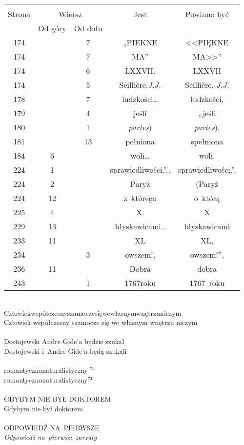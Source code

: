 \documentclass[a4paper,11pt]{article}
\begin{document}
\begin{center}
  \begin{tabular}{|c|c|c|c|c|}
    \hline
    & \multicolumn{2}{c|}{} & & \\
    Strona & \multicolumn{2}{c|}{Wiersz} & Jest
                              & Powinno być \\ \cline{2-3}
    & Od góry & Od dołu & & \\
    \hline
    174 & &  7 & „PIEKNE & <<PIĘKNE  %
    \\
    174 & &  7 & {\footnotesize MA}” & {\footnotesize MA}>>” \\
    174 & &  6 & LXXVII. & LXXVII \\
    174 & &  5 & Seilli\`{e}re,\textit{J.J.}
           & Seilli\`{e}re, \textit{J.J.} \\
    178 & &  7 & ludzkości\ldots & ludzkości. \\
    179 & &  4 & jeśli & „jeśli \\
    180 & &  1 & \textit{partes}) & \textit{partes}). \\
    181 & & 13 & pełniona & spełniona \\
    184 &  6 & & woli\ldots & woli. \\
    224 &  1 & & sprawiedliwości.”., & sprawiedliwości.”. \\
    224 &  2 & & Paryż & (Paryż \\
    224 & 12 & & z~którego & o~którą \\
    225 &  4 & & X. & X \\
    229 & 13 & & błyskawicami.. & błyskawicami \\
    233 & 11 & & XL & XL, \\
    234 & &  3 & owszem!, & owszem!”, \\
    236 & 11 & & Dobra & dobra \\
    243 & &  1 & 1767roku & 1767~roku \\
    \hline
  \end{tabular}

\end{center}


\noindent
{} \\
\Jest  Człowiekwspółczesnyszamoczesięwewłasnymwnętrzuniczym \\
\Powin Człowiek współczesny szamocze się we własnym wnętrzu niczym \\
 \\
\Jest  Dostojewski Andre Gide'a będzie szukał \\
\Powin Dostojewski i~Andre Gide'a będą szukali \\
 \\
\Jest  romantyczno\dywiz naturalistyczny $^{ 74 }$ \\
\Powin romantyczno\dywiz naturalistyczny$^{ 74 }$ \\
 \\
\Jest  G{\footnotesize DYBYM NIE BYŁ DOKTOREM} \\
\Powin Gdybym nie był doktorem \\
 \\
\Jest  ODPOWIEDŹ NA~PIERWSZE \\
\Powin \textit{Odpowiedź na~pierwsze zarzuty} \\
\end{document}
